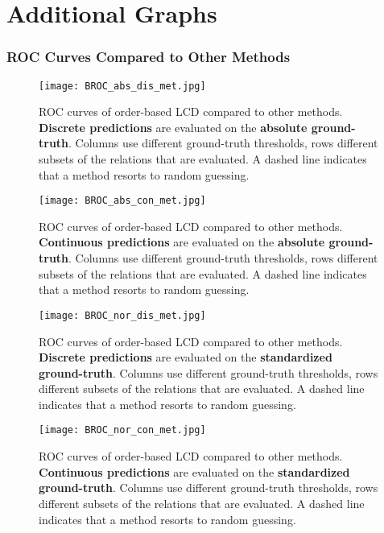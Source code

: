 \newpage
\section{Additional Graphs}
\label{appendix:roc}

\subsubsection{ROC Curves Compared to Other Methods}

\begin{figure}[H]
    \centering
    \texttt{[image: BROC\_abs\_dis\_met.jpg]}
    \caption{ROC curves of order-based LCD compared to other methods. \textbf{Discrete predictions} are evaluated on the \textbf{absolute ground-truth}. Columns use different ground-truth thresholds, rows different subsets of the relations that are evaluated. A dashed line indicates that a method resorts to random guessing.}
\end{figure}
\begin{figure}[H]
    \centering
    \texttt{[image: BROC\_abs\_con\_met.jpg]}
    \caption{ROC curves of order-based LCD compared to other methods. \textbf{Continuous predictions} are evaluated on the \textbf{absolute ground-truth}. Columns use different ground-truth thresholds, rows different subsets of the relations that are evaluated. A dashed line indicates that a method resorts to random guessing.}
\end{figure}
\begin{figure}[H]
    \centering
    \texttt{[image: BROC\_nor\_dis\_met.jpg]}
    \caption{ROC curves of order-based LCD compared to other methods. \textbf{Discrete predictions} are evaluated on the \textbf{standardized ground-truth}. Columns use different ground-truth thresholds, rows different subsets of the relations that are evaluated. A dashed line indicates that a method resorts to random guessing.}
    \label{fig:app:rocversteeg}
\end{figure}
\begin{figure}[H]
    \centering
    \texttt{[image: BROC\_nor\_con\_met.jpg]}
    \caption{ROC curves of order-based LCD compared to other methods. \textbf{Continuous predictions} are evaluated on the \textbf{standardized ground-truth}. Columns use different ground-truth thresholds, rows different subsets of the relations that are evaluated. A dashed line indicates that a method resorts to random guessing.}
\end{figure}

